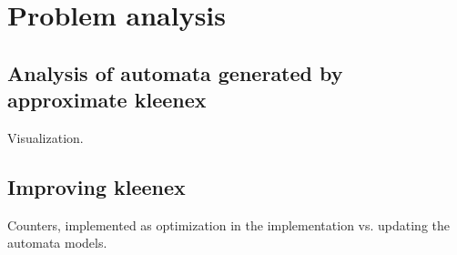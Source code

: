 \section{Problem analysis}

\subsection{Analysis of automata generated by approximate kleenex}

Visualization.

\subsection{Improving kleenex}

Counters, implemented as optimization in the implementation vs. updating the
automata models.

